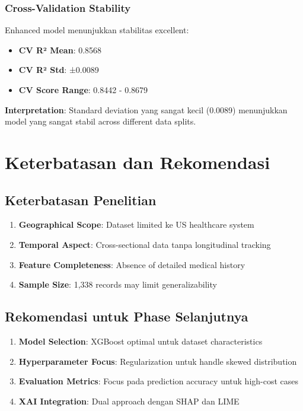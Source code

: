 \subsubsection{Cross-Validation Stability}
Enhanced model menunjukkan stabilitas excellent:
\begin{itemize}
    \item \textbf{CV R² Mean}: 0.8568
    \item \textbf{CV R² Std}: ±0.0089
    \item \textbf{CV Score Range}: 0.8442 - 0.8679
\end{itemize}

\textbf{Interpretation}: Standard deviation yang sangat kecil (0.0089) menunjukkan model yang sangat stabil across different data splits.

\section{Keterbatasan dan Rekomendasi}
\label{sec:keterbatasan}

\subsection{Keterbatasan Penelitian}
\label{subsec:keterbatasan}

\begin{enumerate}
    \item \textbf{Geographical Scope}: Dataset limited ke US healthcare system
    \item \textbf{Temporal Aspect}: Cross-sectional data tanpa longitudinal tracking
    \item \textbf{Feature Completeness}: Absence of detailed medical history
    \item \textbf{Sample Size}: 1,338 records may limit generalizability
\end{enumerate}

\subsection{Rekomendasi untuk Phase Selanjutnya}
\label{subsec:rekomendasi}

\begin{enumerate}
    \item \textbf{Model Selection}: XGBoost optimal untuk dataset characteristics
    \item \textbf{Hyperparameter Focus}: Regularization untuk handle skewed distribution
    \item \textbf{Evaluation Metrics}: Focus pada prediction accuracy untuk high-cost cases
    \item \textbf{XAI Integration}: Dual approach dengan SHAP dan LIME
\end{enumerate}

